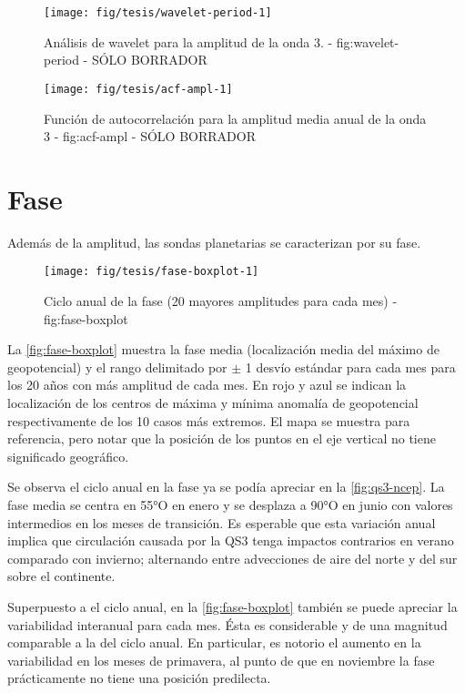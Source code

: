 \documentclass[spanish,a4paper]{book}
\begin{document}
\begin{figure}
\texttt{[image: fig/tesis/wavelet-period-1]} \caption{Análisis de wavelet para la amplitud de la onda 3. - fig:wavelet-period - SÓLO BORRADOR}\label{fig:wavelet-period}
\end{figure}

\begin{figure}
\texttt{[image: fig/tesis/acf-ampl-1]} \caption{Función de autocorrelación para la amplitud media anual de la onda 3 - fig:acf-ampl - SÓLO BORRADOR}\label{fig:acf-ampl}
\end{figure}

\section{Fase}\label{fase}

Además de la amplitud, las sondas planetarias se caracterizan por su
fase. 

\begin{figure}

{\centering \texttt{[image: fig/tesis/fase-boxplot-1]} 

}

\caption{Ciclo anual de la fase (20 mayores amplitudes para cada mes) - fig:fase-boxplot}\label{fig:fase-boxplot}
\end{figure}

La \autoref{fig:fase-boxplot} muestra la fase media (localización media
del máximo de geopotencial) y el rango delimitado por \(\pm\) 1 desvío
estándar para cada mes para los 20 años con más amplitud de cada mes. En
rojo y azul se indican la localización de los centros de máxima y mínima
anomalía de geopotencial respectivamente de los 10 casos más extremos.
El mapa se muestra para referencia, pero notar que la posición de los
puntos en el eje vertical no tiene significado geográfico.

Se observa el ciclo anual en la fase ya se podía apreciar en la
\autoref{fig:qs3-ncep}. La fase media se centra en 55°O en enero y se
desplaza a 90°O en junio con valores intermedios en los meses de
transición. Es esperable que esta variación anual implica que
circulación causada por la QS3 tenga impactos contrarios en verano
comparado con invierno; alternando entre advecciones de aire del norte y
del sur sobre el continente.

Superpuesto a el ciclo anual, en la \autoref{fig:fase-boxplot} también
se puede apreciar la variabilidad interanual para cada mes. Ésta es
considerable y de una magnitud comparable a la del ciclo anual. En
particular, es notorio el aumento en la variabilidad en los meses de
primavera, al punto de que en noviembre la fase prácticamente no tiene
una posición predilecta.
\end{document}
